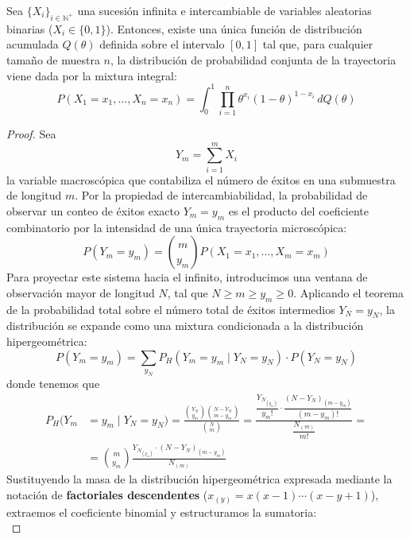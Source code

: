 \begin{teo}
Sea $\{X_i\}_{i \in \mathbb{N}^+}$ una sucesión infinita e intercambiable de variables aleatorias binarias ($X_i \in \{0, 1\}$). Entonces, existe una única función de distribución acumulada $Q(\theta)$ definida sobre el intervalo $[0, 1]$ tal que, para cualquier tamaño de muestra $n$, la distribución de probabilidad conjunta de la trayectoria viene dada por la mixtura integral:
\begin{equation*}
    P(X_1 = x_1, \dots, X_n = x_n) = \int_{0}^{1} \prod_{i=1}^{n} \theta^{x_i} (1 - \theta)^{1 - x_i} \, dQ(\theta)
\end{equation*}

\begin{proof}
    Sea 
    $$Y_m = \sum_{i=1}^{m} X_i$$ 
    la variable macroscópica que contabiliza el número de éxitos en una submuestra de longitud $m$. Por la propiedad de intercambiabilidad, la probabilidad de observar un conteo de éxitos exacto $Y_m = y_m$ es el producto del coeficiente combinatorio por la intensidad de una única trayectoria microscópica:
    \begin{equation*}
        P(Y_m = y_m) = \binom{m}{y_m} P(X_1 = x_1, \dots, X_m = x_m)
    \end{equation*}
    Para proyectar este sistema hacia el infinito, introducimos una ventana de observación mayor de longitud $N$, tal que $N \geq m \geq y_m \geq 0$. Aplicando el teorema de la probabilidad total sobre el número total de éxitos intermedios $Y_N = y_N$, la distribución se expande como una mixtura condicionada a la distribución hipergeométrica:
    \begin{equation*}
        P(Y_m = y_m) = \sum_{y_N} P_H(Y_m = y_m \mid Y_N = y_N) \cdot P(Y_N = y_N)
    \end{equation*}
    donde tenemos que 
    \begin{align*}
        P_H(Y_m &= y_m \mid Y_N = y_N) = \frac{\binom{Y_N}{y_m} \binom{N - Y_N}{m - y_m}}{\binom{N}{m}}= \frac{\dfrac{Y_{N_{(y_m)}}}{y_m!} \cdot \dfrac{(N - Y_N)_{(m - y_m)}}{(m - y_m)!}}{\dfrac{N_{(m)}}{m!}}=\\
        &=\binom{m}{y_m} \frac{Y_{N_{(y_m)}} \cdot (N - Y_N)_{(m - y_m)}}{N_{(m)}}
    \end{align*}
    Sustituyendo la masa de la distribución hipergeométrica expresada mediante la notación de \textbf{factoriales descendentes} ($x_{(y)} = x(x-1)\cdots(x-y+1)$), extraemos el coeficiente binomial y estructuramos la sumatoria:
    \begin{equation*}

\end{equation*}
\end{proof}
\end{teo}

